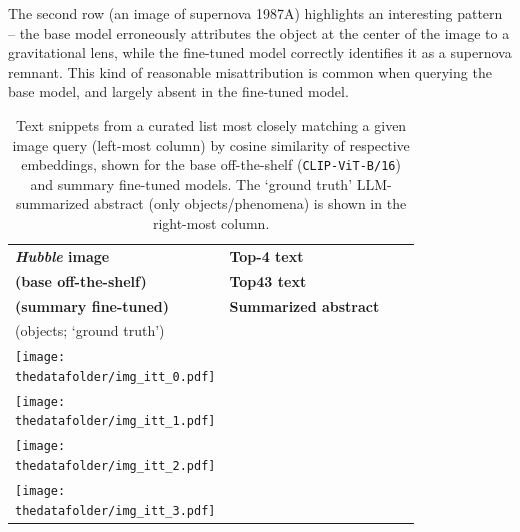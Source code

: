 \documentclass{article} %
\newcommand{\hubble}{\emph{Hubble}\xspace}
\begin{document}
  The second row (an image of supernova 1987A) highlights an interesting pattern -- the base model erroneously attributes the object at the center of the image to a gravitational lens, while the fine-tuned model correctly identifies it as a supernova remnant. This kind of reasonable misattribution is common when querying the base model, and largely absent in the fine-tuned model.
  
  \begin{table}[h!]
   \centering
   \renewcommand{\arraystretch}{0.1}
   \begin{tabular}{m{3cm} m{3.0cm} m{3.0cm} m{3.2cm}}
       \toprule
       \centering \bfseries \hubble image & \centering \textbf{Top-4 text} \\ \small\textbf{\textcolor{deeppurple}{(base off-the-shelf)}} & \centering  \textbf{Top43 text} \\ \small\textbf{\textcolor{deepred}{(summary fine-tuned)}} & \centering \textbf{Summarized abstract} \\ (objects; `ground truth') \tabularnewline
       \midrule
       \centering \texttt{[image: \\thedatafolder/img\_itt\_0.pdf]} & \centering \scriptsize  & \centering  \scriptsize  &  {\scriptsize } \tabularnewline
       \midrule
       \centering \texttt{[image: \\thedatafolder/img\_itt\_1.pdf]} & \centering \scriptsize  & \centering  \scriptsize  &  {\scriptsize } \tabularnewline
       \midrule
       \centering \texttt{[image: \\thedatafolder/img\_itt\_2.pdf]} & \centering \scriptsize  & \centering  \scriptsize  &  {\scriptsize } \tabularnewline
       \midrule
       \centering \texttt{[image: \\thedatafolder/img\_itt\_3.pdf]} & \centering \scriptsize  & \centering  \scriptsize  &  {\scriptsize } \tabularnewline
       \bottomrule
   \end{tabular}
   \caption{Text snippets from a curated list most closely matching a given image query (left-most column) by cosine similarity of respective embeddings, shown for the \textcolor{deeppurple}{base off-the-shelf} (\texttt{CLIP-ViT-B/16}) and \textcolor{deepred}{summary fine-tuned} models. The `ground truth' LLM-summarized abstract (only objects/phenomena) is shown in the right-most column.}
   \label{tab:itt}
 \end{table}

 
  
\end{document}
